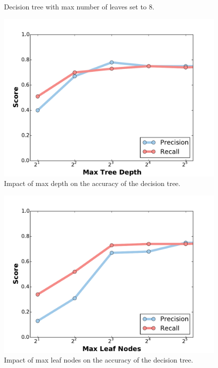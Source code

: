 \begin{itemize}
\begin{figure}[h!]
    \centering
    \caption{Decision tree with max number of leaves set to 8.}
    \label{fig:tree_sample}
\end{figure}

\begin{figure}[h!]
    \centering
	\includegraphics[width=0.7\linewidth]{figure/depth.pdf}
	\caption{Impact of max depth on the accuracy of the decision tree.}
	\label{fig:tree_depth}
\end{figure}

\begin{figure}[h!]
    \centering
	\includegraphics[width=0.7\linewidth]{figure/leaves.pdf}
	\caption{Impact of max leaf nodes on the accuracy of the decision tree.}
	\label{fig:tree_leaves}
\end{figure}


\end{itemize}

